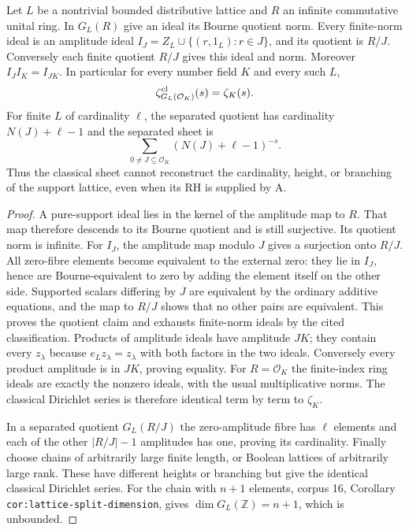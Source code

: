\begin{theorem}[NN-S004]
Let $L$ be a nontrivial bounded distributive lattice and $R$ an
infinite commutative unital ring. In $G_L(R)$ give an ideal its Bourne quotient norm.
Every finite-norm ideal is an amplitude ideal
$I_J=Z_L\cup\{(r,1_L):r\in J\}$, and its quotient is $R/J$.
Conversely each finite quotient $R/J$ gives this ideal and norm.
Moreover $I_JI_K=I_{JK}$. In particular for every number field $K$
and every such $L$,
\[
 \zeta^{\rm cl}_{G_L(\mathcal O_K)}(s)=\zeta_K(s).
\]
For finite $L$ of cardinality $\ell$, the separated quotient has
cardinality $N(J)+\ell-1$ and the separated sheet is
\[
 \sum_{0\ne J\subseteq\mathcal O_K}(N(J)+\ell-1)^{-s}.
\]
Thus the classical sheet cannot reconstruct the cardinality, height,
or branching of the support lattice, even when its RH is supplied by A.
\end{theorem}

\begin{proof}
A pure-support ideal lies in the kernel of the amplitude map to
$R$. That map therefore descends to its Bourne quotient and is
still surjective. Its quotient norm is infinite. For $I_J$, the
amplitude map modulo $J$ gives a surjection onto $R/J$.
All zero-fibre elements become equivalent to the external zero:
they lie in $I_J$, hence are Bourne-equivalent to zero by adding
the element itself on the other side. Supported scalars differing
by $J$ are equivalent by the ordinary additive equations, and the
map to $R/J$ shows that no other pairs are equivalent. This proves
the quotient claim and exhausts finite-norm ideals by the cited
classification. Products of amplitude ideals have amplitude $JK$;
they contain every $z_\lambda$ because $e_Lz_\lambda=z_\lambda$
with both factors in the two ideals. Conversely every product
amplitude is in $JK$, proving equality. For $R=\mathcal O_K$ the
finite-index ring ideals are exactly the nonzero ideals, with
the usual multiplicative norms. The classical Dirichlet series
is therefore identical term by term to $\zeta_K$.

In a separated quotient $G_L(R/J)$ the zero-amplitude fibre has
$\ell$ elements and each of the other $|R/J|-1$ amplitudes has
one, proving its cardinality. Finally choose chains of arbitrarily
large finite length, or Boolean lattices of arbitrarily large rank.
These have different heights or branching but give the identical
classical Dirichlet series. For the chain with $n+1$ elements,
corpus 16, Corollary \texttt{cor:lattice-split-dimension}, gives
$\dim G_L(\mathbb Z)=n+1$, which is unbounded.
\end{proof}

